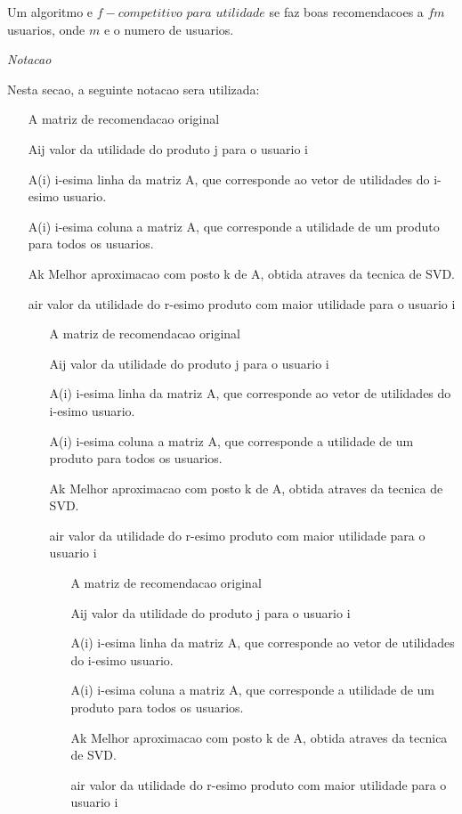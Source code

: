 \documentclass[a4paper,10pt]{article}
\begin{document}
Um algoritmo e $f-competitivo$ $para$ $utilidade$
se faz boas recomendacoes a $fm$ usuarios, onde $m$ e o numero de usuarios. 

\textit{Notacao}

Nesta secao, a seguinte notacao sera utilizada:

\begin{itemize}
\item[A] matriz de recomendacao original
\item[Aij] valor da utilidade do produto j para o usuario i
\item[A(i)] i-esima linha da matriz A, que corresponde ao
vetor de utilidades do i-esimo usuario.
\item[A(i)] i-esima coluna a matriz A, que corresponde a 
utilidade de um produto para todos os usuarios.
\item[Ak] Melhor aproximacao com posto k de A, obtida atraves da tecnica de SVD.
\item[air] valor da utilidade do r-esimo produto com maior utilidade
para o usuario i 
\begin{itemize}
\item[A] matriz de recomendacao original
\item[Aij] valor da utilidade do produto j para o usuario i
\item[A(i)] i-esima linha da matriz A, que corresponde ao
vetor de utilidades do i-esimo usuario.
\item[A(i)] i-esima coluna a matriz A, que corresponde a 
utilidade de um produto para todos os usuarios.
\item[Ak] Melhor aproximacao com posto k de A, obtida atraves da tecnica de SVD.
\item[air] valor da utilidade do r-esimo produto com maior utilidade
para o usuario i 
\begin{itemize}
\item[A] matriz de recomendacao original
\item[Aij] valor da utilidade do produto j para o usuario i
\item[A(i)] i-esima linha da matriz A, que corresponde ao
vetor de utilidades do i-esimo usuario.
\item[A(i)] i-esima coluna a matriz A, que corresponde a 
utilidade de um produto para todos os usuarios.
\item[Ak] Melhor aproximacao com posto k de A, obtida atraves da tecnica de SVD.
\item[air] valor da utilidade do r-esimo produto com maior utilidade
para o usuario i 
\end{itemize}
\end{itemize}
\end{itemize}
\end{document}
